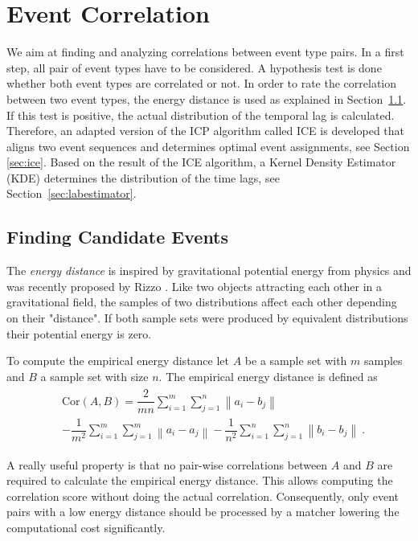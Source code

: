 \documentclass[conference]{IEEEtran}
\theoremstyle{examplestyle}
\begin{document}
\section{Event Correlation}
We aim at finding and analyzing correlations between event type pairs. In a first step, all pair of event types have to be considered. A hypothesis test is done whether both event types are correlated or not. In order to rate the correlation between two event types,  the energy distance \cite{Rizzo2016} is used as explained in Section~\ref{sec:energyDistance}. 
If this test is positive, the actual distribution of the temporal lag is calculated. Therefore, an adapted version of the \ac{ICP} algorithm called \ac{ICE} is developed that aligns two event sequences and determines optimal event assignments, see Section \ref{sec:ice}.
Based on the result of the \ac{ICE} algorithm, a Kernel Density Estimator (KDE) determines the distribution of the time lags,  see Section~\ref{sec:labestimator}.




\subsection{Finding Candidate Events}
\label{sec:energyDistance}
The \textit{energy distance} is inspired by gravitational potential energy from physics and was recently proposed by Rizzo \cite{Rizzo2016}. Like two objects attracting each other in a gravitational field, the samples of two distributions affect each other depending on their "distance". If both sample sets were produced by equivalent distributions their potential energy is zero.

To compute the empirical energy distance let \(A\) be a sample set with \(m\) samples and \(B\) a sample set with size \(n\). The empirical energy distance is defined as
\begin{align}
\begin{split}
	& \text{Cor}(A, B) = \dfrac{2}{m n} \sum_{i = 1}^m \sum_{j = 1}^n \left\| a_i - b_j \right\| \\
	& - \dfrac{1}{m^2} \sum_{i = 1}^m \sum_{j = 1}^m \left\| a_i - a_j \right\| - \dfrac{1}{n^2} \sum_{i = 1}^n \sum_{j = 1}^n \left\| b_i - b_j \right\| ~.
\end{split}
\end{align}

A really useful property is that no pair-wise correlations between \(A\) and \(B\) are required to calculate the empirical energy distance. This allows computing the correlation score without doing the actual correlation. Consequently, only event pairs with a low energy distance should be processed by a matcher lowering the computational cost significantly.
\end{document}
